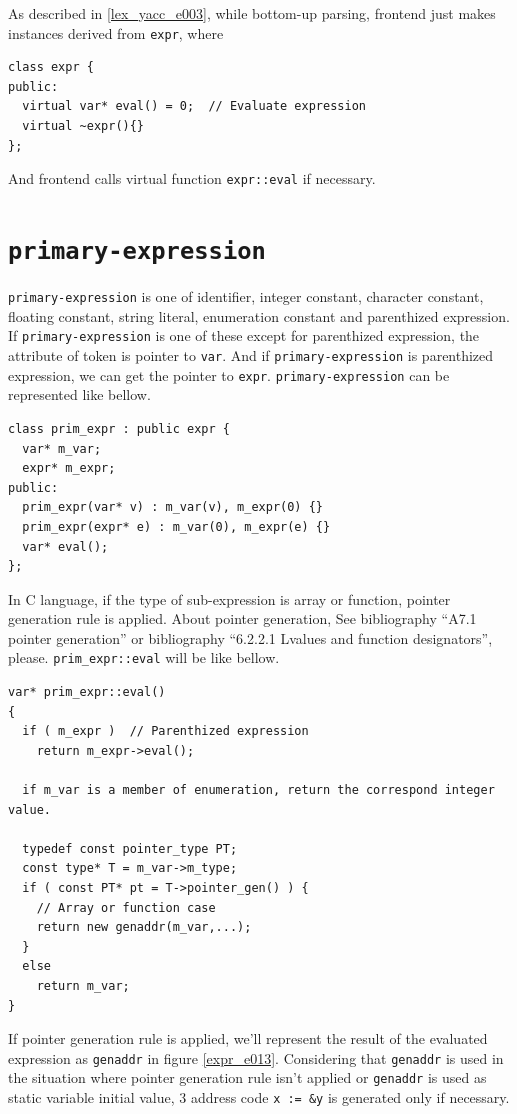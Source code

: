 As described in \ref{lex_yacc_e003}, 
while bottom-up parsing, frontend just makes instances
derived from {\tt{expr}}, where
\begin{verbatim}
class expr {
public:
  virtual var* eval() = 0;  // Evaluate expression
  virtual ~expr(){}
};
\end{verbatim}
And frontend calls virtual function {\tt{expr::eval}} if necessary.

\section{\tt{primary-expression}}
\label{expr_e015}
{\tt{primary-expression}} is one of identifier, integer constant,
character constant, floating constant, string literal, enumeration
constant and parenthized expression. If {\tt{primary-expression}} is 
one of these except for parenthized expression, the attribute of token
is pointer to {\tt{var}}. And if {\tt{primary-expression}} is 
parenthized expression, we can get the pointer to {\tt{expr}}.
{\tt{primary-expression}} can be represented like bellow.
\begin{verbatim}
class prim_expr : public expr {
  var* m_var;
  expr* m_expr;
public:
  prim_expr(var* v) : m_var(v), m_expr(0) {}
  prim_expr(expr* e) : m_var(0), m_expr(e) {}
  var* eval();
};
\end{verbatim}

In C language, if the type of sub-expression is array or function,
pointer generation rule is applied. About pointer generation,
See bibliography
\cite{KR} ``A7.1 pointer generation'' or
bibliography \cite{ISO} ``6.2.2.1 Lvalues and function designators'', please.
{\tt{prim\_expr::eval}} will be like bellow.
\begin{verbatim}
var* prim_expr::eval()
{
  if ( m_expr )  // Parenthized expression
    return m_expr->eval();

  if m_var is a member of enumeration, return the correspond integer value.

  typedef const pointer_type PT;
  const type* T = m_var->m_type;
  if ( const PT* pt = T->pointer_gen() ) {
    // Array or function case
    return new genaddr(m_var,...);
  }
  else
    return m_var;
}
\end{verbatim}
If pointer generation rule is applied, we'll represent the result of
the evaluated expression as {\tt{genaddr}} in figure \ref{expr_e013}.
Considering that {\tt{genaddr}} is used in the situation
where pointer generation rule isn't applied or {\tt{genaddr}} is used
as static variable initial value,
3 address code {\tt{x := \&y}} is generated only if necessary.

